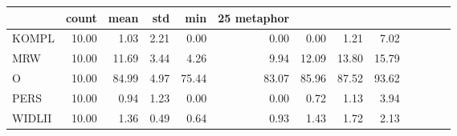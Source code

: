 \begin{tabular}{lrrrrrrrr}
\toprule
 & count & mean & std & min & 25%
metaphor &  &  &  &  &  &  &  &  \\
\midrule
KOMPL & 10.00 & 1.03 & 2.21 & 0.00 & 0.00 & 0.00 & 1.21 & 7.02 \\
MRW & 10.00 & 11.69 & 3.44 & 4.26 & 9.94 & 12.09 & 13.80 & 15.79 \\
O & 10.00 & 84.99 & 4.97 & 75.44 & 83.07 & 85.96 & 87.52 & 93.62 \\
PERS & 10.00 & 0.94 & 1.23 & 0.00 & 0.00 & 0.72 & 1.13 & 3.94 \\
WIDLII & 10.00 & 1.36 & 0.49 & 0.64 & 0.93 & 1.43 & 1.72 & 2.13 \\
\bottomrule
\end{tabular}
